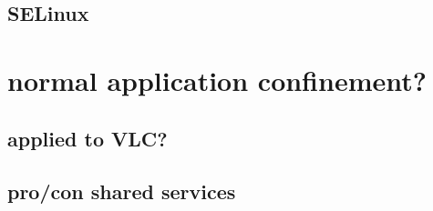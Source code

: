 
\subsection{SELinux}

\section{normal application confinement?}


\subsection{applied to VLC?}



\subsection{pro/con shared services}



%
